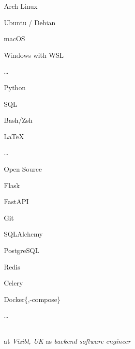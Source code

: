 \SmallSep

\begin{multicols}{3}
\begin{compactitem}[\color{Cyan}$\circ$]
	\item Arch Linux
	\item Ubuntu / Debian
	\item macOS
	\item Windows with WSL
	\item \ldots
\end{compactitem}
\end{multicols}

\SmallSep

\begin{multicols}{3}
\begin{compactitem}[\color{Cyan}$\circ$]
    \item Python
    \item SQL
    \item Bash/Zsh
    \item \LaTeX
	\item \ldots
\end{compactitem}
\end{multicols}

\SmallSep

\begin{multicols}{3}
\begin{compactitem}[\color{Cyan}$\circ$]
    \item Open Source \heart\
    \item Flask
    \item FastAPI
    \item Git
    \item SQLAlchemy
    \item PostgreSQL
    \item Redis
    \item Celery
    \item Docker\{,-compose\}
    \item \ldots
\end{compactitem}
\end{multicols}

\Sep



 \\
at \textit{Vizibl, UK}
as \textit{backend software engineer}
\SmallSep

